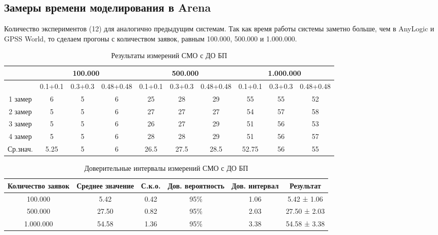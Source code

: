 \documentclass[a4paper,14pt]{report} %
\begin{document}
\subsection{Замеры времени моделирования в Arena}
Количество экспериментов (12) для аналогично предыдущим системам. Так как время работы системы заметно больше, чем в AnyLogic и GPSS World, то сделаем прогоны с количеством заявок, равным 100.000, 500.000 и 1.000.000. 

\begin{table}[h!]
\caption{Результаты измерений СМО с ДО БП}
\begin{tabular}{|c|c|c|c|c|c|c|c|c|c|}
\hline
 & \multicolumn{3}{|c|}{100.000} & \multicolumn{3}{|c|}{500.000} & \multicolumn{3}{|c|}{1.000.000} \\
\hline
 & 0.1+0.1 & 0.3+0.3 & 0.48+0.48 & 0.1+0.1 & 0.3+0.3 & 0.48+0.48 & 0.1+0.1 & 0.3+0.3 & 0.48+0.48 \\
\hline
1 замер & 6 & 5 & 6 & 25 & 28 & 29 & 55 & 55 & 52   \\
\hline
2 замер & 5 & 5 & 6 & 27 & 27 & 27 & 54 & 57 & 58   \\
\hline
3 замер & 5 & 5 & 6 & 26 & 27 & 29 & 51 & 56 & 53  \\
\hline
4 замер & 5 & 5 & 6 & 28 & 28 & 29 & 51 & 56 & 57  \\
\hline
Ср.знач. & 5.25 & 5 & 6 & 26.5 & 27.5 & 28.5 & 52.75 & 56 & 55   \\
\hline
\end{tabular}
\end{table} 

\begin{table}[h!]
\caption{Доверительные интервалы измерений СМО с ДО БП}
\begin{tabular}{|c|c|c|c|c|c|}
\hline
 Количество заявок & Среднее значение & С.к.о. & Дов. вероятность & Дов. интервал & Результат\\
\hline
100.000 & 5.42 & 0.42 & 95\% & 1.06 & 5.42 ± 1.06 \\
\hline
500.000 & 27.50 & 0.82 & 95\% & 2.03 & 27.50 ± 2.03 \\
\hline
1.000.000 & 54.58 & 1.36 & 95\% & 3.38 & 54.58 ± 3.38 \\
\hline
\end{tabular}
\end{table} 
\end{document}
